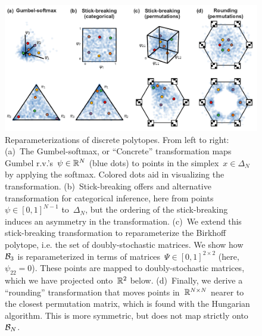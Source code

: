 \documentclass[twoside]{article}
\begin{document}
\begin{figure}[ht!]
  \centering
  \includegraphics[width=6.5in]{../figures/figure1.pdf} 
  \caption{Reparameterizations of discrete polytopes.  From left to
    right: (a)~The Gumbel-softmax, or ``Concrete'' transformation maps
    Gumbel r.v.'s~${\psi \in \mathbb{R}^N}$ (blue dots) to points in the
    simplex~${x \in \Delta_{N}}$ by applying the softmax.  Colored
    dots aid in visualizing the transformation.  (b)~Stick-breaking
    offers and alternative transformation for categorical inference,
    here from points~$\psi \in [0,1]^{N-1}$ to~$\Delta_N$, but the
    ordering of the stick-breaking induces an asymmetry in the
    transformation.  (c)~We extend this stick-breaking transformation
    to reparameterize the Birkhoff polytope, i.e. the set of
    doubly-stochastic matrices. We show how~$\mathcal{B}_3$ is reparameterized in
    terms of matrices~$\Psi \in [0,1]^{2 \times 2}$
    (here,~${\psi_{22}=0}$).  These points are mapped to
    doubly-stochastic matrices, which we have projected
    onto~$\mathbb{R}^2$ below.  (d)~Finally, we derive a ``rounding'' transformation
    that moves points in~$\mathbb{R}^{N \times N}$ nearer to the closest
    permutation matrix, which is found with the Hungarian algorithm.
    This is more symmetric, but does not map strictly onto~$\mathcal{B}_N$.
  }
\label{fig:transforms}
\end{figure}
\end{document}
